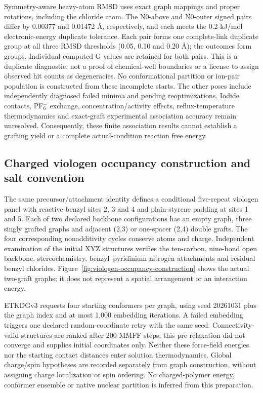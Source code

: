 \documentclass[11pt]{article}
\begin{document}
Symmetry-aware heavy-atom RMSD uses exact graph mappings and proper rotations, including the chloride atom. The N0-above and N0-outer signed pairs differ by 0.00377 and 0.01472 \AA, respectively, and each meets the 0.2-kJ/mol electronic-energy duplicate tolerance. Each pair forms one complete-link duplicate group at all three RMSD thresholds (0.05, 0.10 and 0.20 \AA); the \ChlorideOutcomeCount{} outcomes form \ChlorideDuplicateCount{} groups. Individual computed G values are retained for both pairs. This is a duplicate diagnostic, not a proof of chemical-well boundaries or a license to assign observed hit counts as degeneracies. No conformational partition or ion-pair population is constructed from these incomplete starts. The other poses include independently diagnosed failed minima and pending reoptimizations. Iodide contacts, PF$_6^-$ exchange, concentration/activity effects, reflux-temperature thermodynamics and exact-graft experimental association accuracy remain unresolved. Consequently, these finite association results cannot establish a grafting yield or a complete actual-condition reaction free energy.

\subsection{Charged viologen occupancy construction and salt convention}
The same precursor/attachment identity defines a conditional five-repeat viologen panel with reactive benzyl sites 2, 3 and 4 and plain-styrene padding at sites 1 and 5. Each of two declared backbone configurations has an empty graph, three singly grafted graphs and adjacent (2,3) or one-spacer (2,4) double grafts. The four corresponding nonadditivity cycles conserve atoms and charge. Independent examination of the initial XYZ structures verifies the ten-carbon, nine-bond open backbone, stereochemistry, benzyl--pyridinium nitrogen attachments and residual benzyl chlorides. Figure~\ref{fig:viologen-occupancy-construction} shows the actual two-graft graphs; it does not represent a spatial arrangement or an interaction energy.

ETKDGv3 requests four starting conformers per graph, using seed 20261031 plus the graph index and at most 1,000 embedding iterations. A failed embedding triggers one declared random-coordinate retry with the same seed. Connectivity-valid structures are ranked after 200 MMFF steps; this pre-relaxation did not converge and supplies initial coordinates only. Neither these force-field energies nor the starting contact distances enter solution thermodynamics. Global charge/spin hypotheses are recorded separately from graph construction, without assigning charge localization or spin ordering. No charged-polymer energy, conformer ensemble or native nuclear partition is inferred from this preparation.
\end{document}
